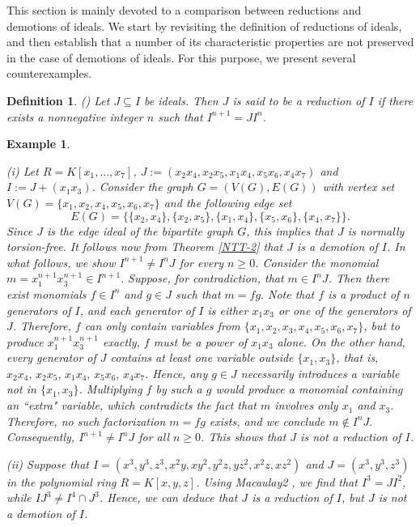 \documentclass[11pt]{amsart}
\newtheorem{definition}[theorem]{Definition}
\newtheorem{example}[theorem]{Example}
\begin{document}
This section is mainly devoted to a comparison between reductions and demotions of ideals.  We start by revisiting the definition of reductions of ideals, and then establish that a number of its characteristic properties are not preserved in the case of demotions of ideals. For this purpose, we present several counterexamples. 
 
 
 \begin{definition}(\cite[Definition 1.2.1]{HS})
\em{
Let   $J \subseteq I$ be ideals. Then  $J$ is said to be a \textit{reduction} of $I$ if there exists a nonnegative integer $n$ such that 
$I^{n+1} = JI^n$.
}
\end{definition}

 

\begin{example} \label{Example-1} 
\em{
(i) Let $R=K[x_1, \ldots, x_7]$, $J:=(x_2x_4, x_2x_5, x_1x_4, x_5x_6, x_4x_7)$ and $I:=J+(x_1x_3)$. 
Consider the graph  $G=(V(G), E(G))$ with vertex set  $V(G)=\{x_1, x_2, x_4, x_5, x_6, x_7\}$ and the following edge set 
$$E(G)=\{\{x_2,x_4\}, \{x_2,x_5\}, \{x_1,x_4\}, \{x_5,x_6\}, \{x_4,x_7\}\}.$$
 Since $J$ is the edge ideal of the bipartite graph $G$, this implies that $J$ is normally torsion-free. 
It follows now from Theorem \ref{NTT-2} that $J$ is  a demotion of $I$. In what follows, we show   $I^{n+1} \neq I^n  J$ for every $n\geq 0$.
 Consider the monomial $m=x_1^{n+1} x_3^{n+1} \in I^{n+1}.$  
Suppose, for contradiction, that \(m \in I^n  J\). Then there exist monomials \(f \in I^n\) and \(g \in J\) such that $m = f  g.$ 
Note that \(f\) is a product of \(n\) generators of \(I\), and each generator of \(I\) is either \(x_1 x_3\) or one of the generators of \(J\). Therefore, \(f\) can only contain variables from \(\{x_1, x_2, x_3, x_4, x_5, x_6, x_7\}\), but to produce \(x_1^{n+1} x_3^{n+1}\) exactly, \(f\) must be a power of \(x_1 x_3\) alone.  
On the other hand, every generator of \(J\) contains at least one variable outside \(\{x_1, x_3\}\), that is, $x_2x_4,\, x_2x_5,\, x_1x_4,\, x_5x_6,\, x_4x_7.$  
Hence, any \(g \in J\) necessarily introduces a variable not in \(\{x_1, x_3\}\). Multiplying \(f\) by such a \(g\) would produce a monomial containing an ``extra" variable, which contradicts the fact that \(m\) involves only \(x_1\) and \(x_3\).  Therefore, no such factorization \(m = f  g\) exists, and we conclude
 $m \notin I^n  J.$ Consequently, $I^{n+1} \neq I^n  J$ for all $n\geq 0$. This shows that $J$ is not a reduction of $I$. 

(ii) Suppose that   $I=(x^3, y^3, z^3, x^2y, xy^2, y^2z, yz^2, x^2z, xz^2)$ and $J=(x^3, y^3, z^3)$ 
in the polynomial ring $R=K[x,y,z]$. Using  \textit{Macaulay2} \cite{GS}, we find that  $I^3=JI^2$, while $IJ^3\neq I^4\cap J^3$. Hence, 
we can deduce that $J$ is a reduction of $I$, but $J$ is not a demotion of $I$.  
}
\end{example}
\end{document}
